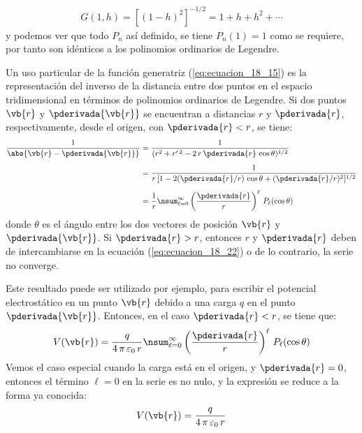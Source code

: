 \begin{align*}
G (1, h) = [(1 - h)^{2}]^{-1/2} =  1 + h + h^{2} + \cdots
\end{align*}
y podemos ver que todo $P_{n}$ así definido, se tiene $P_{n} (1) = 1$ como se requiere, por tanto son idénticos a los polinomios ordinarios de Legendre.
\par
Un uso particular de la función generatriz (\ref{eq:ecuacion_18_15}) es la representación del inverso de la distancia entre dos puntos en el espacio tridimensional en términos de polinomios ordinarios de Legendre. Si dos puntos $\vb{r}$ y $\pderivada{\vb{r}}$ se encuentran a distancias $r$ y $\pderivada{r}$, respectivamente, desde el origen, con $\pderivada{r} < r$, se tiene:
\begin{align}
\begin{aligned}[b]
\dfrac{1}{\abs{\vb{r} - \pderivada{\vb{r}}}} &= \dfrac{1}{(r^{2} + r^{\prime \: 2} - 2 \, r \, \pderivada{r} \, \cos \theta)^{1/2}} \\[0.5em]
&= \dfrac{1}{r \, [ 1 -2 (\pderivada{r}/r) \, \cos \theta + (\pderivada{r}/r)^{2}]^{1/2}} \\[0.5em]
&= \dfrac{1}{r} \nsum_{\ell = 0}^{\infty} \left( \dfrac{\pderivada{r}}{r} \right)^{\ell} \, P_{\ell} (\cos \theta)
\end{aligned}
\label{eq:ecuacion_18_22}
\end{align}
donde $\theta$ es el ángulo entre los dos vectores de posición $\vb{r}$ y $\pderivada{\vb{r}}$. Si $\pderivada{r} > r$, entonces $r$ y $\pderivada{r}$ deben de intercambiarse en la ecuación (\ref{eq:ecuacion_18_22}) o de lo contrario, la serie no converge.
\par
Este resultado puede ser utilizado por ejemplo, para escribir el potencial electrostático en un punto $\vb{r}$ debido a una carga $q$ en el punto $\pderivada{\vb{r}}$. Entonces, en el caso $\pderivada{r} < r$, se tiene que:
\begin{align*}
V (\vb{r}) = \dfrac{q}{4 \, \pi \, \varepsilon_{0} \, r} \nsum_{\ell=0}^{\infty} \left( \dfrac{\pderivada{r}}{r} \right)^{\ell} \, P_{\ell} (\cos \theta)
\end{align*}
Vemos el caso especial cuando la carga está en el origen, y $\pderivada{r} = 0$, entonces el término $\ell = 0$ en la serie es no nulo, y la expresión se reduce a la forma ya conocida:
\begin{align*}
V(\vb{r}) = \dfrac{q}{4 \, \pi \, \varepsilon_{0} \, r}
\end{align*}

